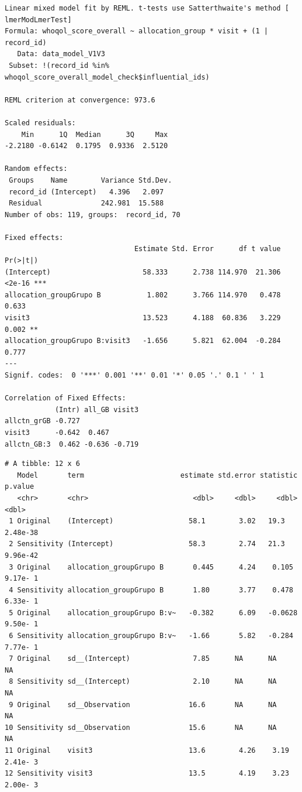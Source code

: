\documentclass[
  letterpaper,
  DIV=11,
  numbers=noendperiod]{scrartcl}
\newenvironment{Shaded}{\begin{snugshade}}{\end{snugshade}}
\newcommand{\NormalTok}[1]{\textcolor[rgb]{0.00,0.23,0.31}{#1}}
\newcommand{\SpecialCharTok}[1]{\textcolor[rgb]{0.37,0.37,0.37}{#1}}
\begin{document}
\begin{verbatim}
Linear mixed model fit by REML. t-tests use Satterthwaite's method [
lmerModLmerTest]
Formula: whoqol_score_overall ~ allocation_group * visit + (1 | record_id)
   Data: data_model_V1V3
 Subset: !(record_id %in% whoqol_score_overall_model_check$influential_ids)

REML criterion at convergence: 973.6

Scaled residuals: 
    Min      1Q  Median      3Q     Max 
-2.2180 -0.6142  0.1795  0.9336  2.5120 

Random effects:
 Groups    Name        Variance Std.Dev.
 record_id (Intercept)   4.396   2.097  
 Residual              242.981  15.588  
Number of obs: 119, groups:  record_id, 70

Fixed effects:
                               Estimate Std. Error      df t value Pr(>|t|)    
(Intercept)                      58.333      2.738 114.970  21.306   <2e-16 ***
allocation_groupGrupo B           1.802      3.766 114.970   0.478    0.633    
visit3                           13.523      4.188  60.836   3.229    0.002 ** 
allocation_groupGrupo B:visit3   -1.656      5.821  62.004  -0.284    0.777    
---
Signif. codes:  0 '***' 0.001 '**' 0.01 '*' 0.05 '.' 0.1 ' ' 1

Correlation of Fixed Effects:
            (Intr) all_GB visit3
allctn_grGB -0.727              
visit3      -0.642  0.467       
allctn_GB:3  0.462 -0.636 -0.719
\end{verbatim}

\begin{Shaded}
\end{Shaded}

\begin{verbatim}
# A tibble: 12 x 6
   Model       term                       estimate std.error statistic   p.value
   <chr>       <chr>                         <dbl>     <dbl>     <dbl>     <dbl>
 1 Original    (Intercept)                  58.1        3.02   19.3     2.48e-38
 2 Sensitivity (Intercept)                  58.3        2.74   21.3     9.96e-42
 3 Original    allocation_groupGrupo B       0.445      4.24    0.105   9.17e- 1
 4 Sensitivity allocation_groupGrupo B       1.80       3.77    0.478   6.33e- 1
 5 Original    allocation_groupGrupo B:v~   -0.382      6.09   -0.0628  9.50e- 1
 6 Sensitivity allocation_groupGrupo B:v~   -1.66       5.82   -0.284   7.77e- 1
 7 Original    sd__(Intercept)               7.85      NA      NA      NA       
 8 Sensitivity sd__(Intercept)               2.10      NA      NA      NA       
 9 Original    sd__Observation              16.6       NA      NA      NA       
10 Sensitivity sd__Observation              15.6       NA      NA      NA       
11 Original    visit3                       13.6        4.26    3.19    2.41e- 3
12 Sensitivity visit3                       13.5        4.19    3.23    2.00e- 3
\end{verbatim}
\end{document}
